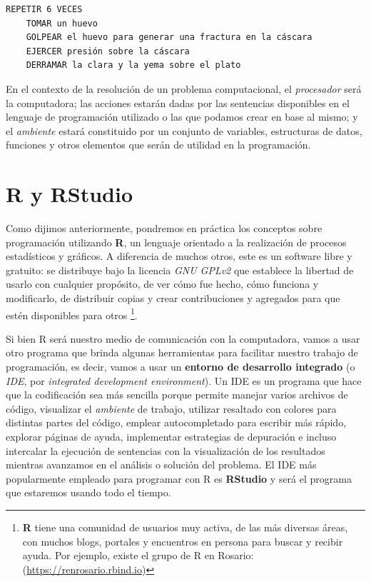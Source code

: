 \documentclass[
]{book}
\begin{document}
\begin{verbatim}
REPETIR 6 VECES
    TOMAR un huevo
    GOLPEAR el huevo para generar una fractura en la cáscara
    EJERCER presión sobre la cáscara
    DERRAMAR la clara y la yema sobre el plato
\end{verbatim}

En el contexto de la resolución de un problema computacional, el \emph{procesador} será la computadora; las acciones estarán dadas por las sentencias disponibles en el lenguaje de programación utilizado o las que podamos crear en base al mismo; y el \emph{ambiente} estará constituido por un conjunto de variables, estructuras de datos, funciones y otros elementos que serán de utilidad en la programación.

\hypertarget{r-y-rstudio}{%
\section{R y RStudio}\label{r-y-rstudio}}

Como dijimos anteriormente, pondremos en práctica los conceptos sobre programación utilizando \textbf{R}, un lenguaje orientado a la realización de procesos estadísticos y gráficos. A diferencia de muchos otros, este es un software libre y gratuito: se distribuye bajo la licencia \emph{GNU GPLv2} que establece la libertad de usarlo con cualquier propósito, de ver cómo fue hecho, cómo funciona y modificarlo, de distribuir copias y crear contribuciones y agregados para que estén disponibles para otros \footnote{\textbf{R} tiene una comunidad de usuarios muy activa, de las más diversas áreas, con muchos blogs, portales y encuentros en persona para buscar y recibir ayuda. Por ejemplo, existe el grupo de R en Rosario: (\url{https://renrosario.rbind.io})}.

Si bien R será nuestro medio de comunicación con la computadora, vamos a usar otro programa que brinda algunas herramientas para facilitar nuestro trabajo de programación, es decir, vamos a usar un \textbf{entorno de desarrollo integrado} (o \emph{IDE}, por \emph{integrated development environment}). Un IDE es un programa que hace que la codificación sea más sencilla porque permite manejar varios archivos de código, visualizar el \emph{ambiente} de trabajo, utilizar resaltado con colores para distintas partes del código, emplear autocompletado para escribir más rápido, explorar páginas de ayuda, implementar estrategias de depuración e incluso intercalar la ejecución de sentencias con la visualización de los resultados mientras avanzamos en el análisis o solución del problema. El IDE más popularmente empleado para programar con R es \textbf{RStudio} y será el programa que estaremos usando todo el tiempo.
\end{document}
